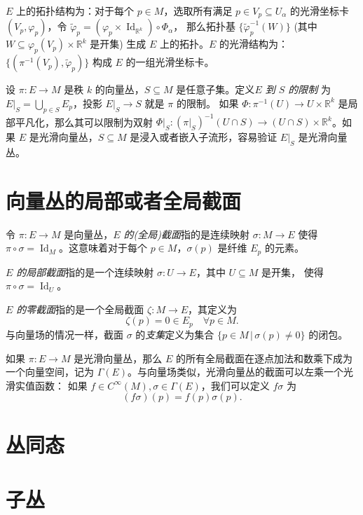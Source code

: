 \documentclass[fontset=none]{Notes}
\DeclareMathOperator\Id{Id}
\begin{document}
\begin{lemma}
  $E$ 上的拓扑结构为：对于每个 $p\in M$，选取所有满足 $p\in V_p\subseteq U_\alpha$
  的光滑坐标卡 $(V_p,\varphi_p)$，令 $\tilde\varphi_p=(\varphi_p\times \Id_{\mathbb{R}^k})\circ\varPhi_\alpha$，
  那么拓扑基 $\{\tilde\varphi_p^{-1}(W)\}$ (其中 $W\subseteq \varphi_p(V_p)\times \mathbb{R}^k$ 是开集)
  生成 $E$ 上的拓扑。$E$ 的光滑结构为：$\{(\pi^{-1}(V_p),\tilde\varphi_p)\}$
  构成 $E$ 的一组光滑坐标卡。
\end{lemma} 


\begin{example}[向量丛的限制]
  设 $\pi:E\to M$ 是秩 $k$ 的向量丛，$S\subseteq M$ 是任意子集。定义\emph{$E$ 到 $S$ 的限制}
  为 $E|_S=\bigcup_{p\in S}E_p$，投影 $E|_S\to S$ 就是 $\pi$ 的限制。
  如果 $\varPhi:\pi^{-1}(U)\to U\times \mathbb{R}^k$ 是局部平凡化，那么其可以限制为双射
  $\varPhi|_S:(\pi|_S)^{-1}(U\cap S)\to (U\cap S)\times \mathbb{R}^k$。如果 $E$
  是光滑向量丛，$S\subseteq M$ 是浸入或者嵌入子流形，容易验证 $E|_S$ 是光滑向量丛。
\end{example}

\section{向量丛的局部或者全局截面}

令 $\pi:E\to M$ 是向量丛，\emph{$E$ 的(全局)截面}指的是连续映射 $\sigma:M\to E$ 使得
$\pi\circ\sigma=\Id_M$。这意味着对于每个 $p\in M$，$\sigma(p)$ 是纤维 $E_p$ 的元素。

\emph{$E$ 的局部截面}指的是一个连续映射 $\sigma:U\to E$，其中 $U\subseteq M$ 是开集，
使得 $\pi\circ\sigma=\Id_U$。

\emph{$E$ 的零截面}指的是一个全局截面 $\zeta:M\to E$，其定义为
\[
  \zeta(p)=0\in E_p\quad \forall p\in M.
\]
与向量场的情况一样，截面 $\sigma$ 的\emph{支集}定义为集合 $\{p\in M\,|\, \sigma(p)\neq 0\}$ 的闭包。

如果 $\pi:E\to M$ 是光滑向量丛，那么 $E$ 的所有全局截面在逐点加法和数乘下成为一个向量空间，记为
$\Gamma(E)$。与向量场类似，光滑向量丛的截面可以左乘一个光滑实值函数：
如果 $f\in C^\infty(M),\sigma\in\Gamma(E)$，我们可以定义 $f\sigma$ 为
\[
  (f\sigma)(p)=f(p)\sigma(p).
\] 


\section{丛同态}

\section{子丛}
\end{document}
